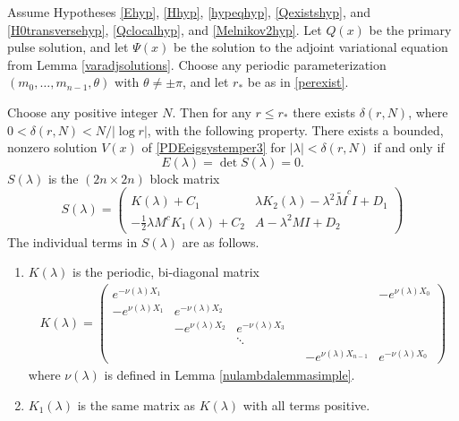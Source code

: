 \documentclass[thesis.tex]{subfiles}
\begin{document}
\begin{theorem}\label{blockmatrixtheorem}
Assume Hypotheses \ref{Ehyp}, \ref{Hhyp}, \ref{hypeqhyp}, \ref{Qexistshyp}, and \ref{H0transversehyp}, \ref{Qclocalhyp}, and \ref{Melnikov2hyp}. Let $Q(x)$ be the primary pulse solution, and let $\Psi(x)$ be the solution to the adjoint variational equation from Lemma \ref{varadjsolutions}. Choose any periodic parameterization $(m_0, \dots, m_{n-1}, \theta)$ with $\theta \neq \pm \pi$, and let $r_*$ be as in \cref{perexist}. 

Choose any positive integer $N$. Then for any $r \leq r_*$ there exists $\delta(r,N)$, where $0 < \delta(r,N) < N/|\log r|$, with the following property. There exists a bounded, nonzero solution $V(x)$ of \cref{PDEeigsystemper3} for $|\lambda| < \delta(r,N)$ if and only if
\begin{equation}\label{blockmatrixcond}
E(\lambda) = \det S(\lambda) = 0.
\end{equation}
$S(\lambda)$ is the $(2n \times 2n)$ block matrix
\begin{equation}\label{blockeq}
S(\lambda) = 
\begin{pmatrix}
K(\lambda) + C_1 & \lambda K_2(\lambda) - \lambda^2 \tilde{M}^c I + D_1 \\
-\frac{1}{2} \lambda M^c K_1(\lambda) + C_2 & A - \lambda^2 MI + D_2
\end{pmatrix}
\end{equation}
The individual terms in $S(\lambda)$ are as follows.

\begin{enumerate}
\item $K(\lambda)$ is the periodic, bi-diagonal matrix
\begin{align*}
K(\lambda) =  
\begin{pmatrix}
e^{-\nu(\lambda)X_1} & & & & & -e^{\nu(\lambda)X_0} \\
-e^{\nu(\lambda)X_1} & e^{-\nu(\lambda)X_2} \\
& -e^{\nu(\lambda)X_2} & e^{-\nu(\lambda)X_3} \\
  & & \ddots & && \\
& & & & -e^{\nu(\lambda)X_{n-1}} & e^{-\nu(\lambda)X_0}
\end{pmatrix}
\end{align*}
where $\nu(\lambda)$ is defined in Lemma \ref{nulambdalemmasimple}.

\item $K_1(\lambda)$ is the same matrix as $K(\lambda)$ with all terms positive.


\end{enumerate}
\end{theorem}
\end{document}
